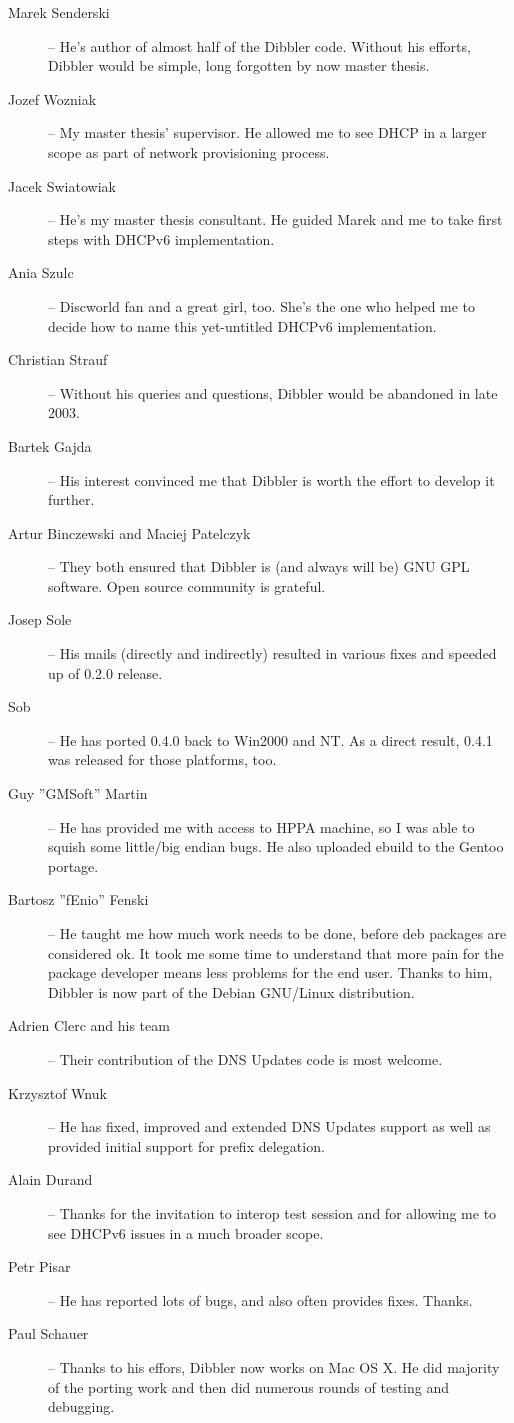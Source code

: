 \begin{description}
\item[Marek Senderski] -- He's author of almost half of the Dibbler
  code. Without his efforts, Dibbler would be simple, long forgotten
  by now master thesis.
\item[Jozef Wozniak] -- My master thesis' supervisor. He allowed me to
  see DHCP in a larger scope as part of network provisioning process.
\item[Jacek Swiatowiak] -- He's my master thesis consultant. He guided
  Marek and me to take first steps with DHCPv6 implementation.
\item[Ania Szulc] -- Discworld fan and a great girl, too. She's the one
  who helped me to decide how to name this yet-untitled DHCPv6 implementation.
\item[Christian Strauf] -- Without his queries and questions, Dibbler
  would be abandoned in late 2003.
\item[Bartek Gajda] -- His interest convinced me that Dibbler is worth
  the effort to develop it further.
\item[Artur Binczewski and Maciej Patelczyk] -- They both ensured that
  Dibbler is (and always will be) GNU GPL software. Open source
  community is grateful.
\item[Josep Sole] -- His mails (directly and indirectly) resulted in
  various fixes and speeded up of 0.2.0 release.
\item[Sob] -- He has ported 0.4.0 back to Win2000 and NT. As a direct
  result, 0.4.1 was released for those platforms, too.
\item[Guy ''GMSoft'' Martin] -- He has provided me with access to HPPA
  machine, so I was able to squish some little/big endian bugs. He
  also uploaded ebuild to the Gentoo portage.
\item[Bartosz ''fEnio'' Fenski] -- He taught me how much work needs to
  be done, before deb packages are considered ok. It took me some time
  to understand that more pain for the package developer means less
  problems for the end user.  Thanks to him, Dibbler is now part of
  the Debian GNU/Linux distribution.
\item[Adrien Clerc and his team] -- Their contribution of the DNS
  Updates code is most welcome.
\item[Krzysztof Wnuk] -- He has fixed, improved and extended DNS
  Updates support as well as provided initial support for prefix
  delegation.
\item[Alain Durand] -- Thanks for the invitation to interop test
  session and for allowing me to see DHCPv6 issues in a much broader
  scope.
\item[Petr Pisar] -- He has reported lots of bugs, and also often
  provides fixes.  Thanks.
\item[Paul Schauer] -- Thanks to his effors, Dibbler now works on Mac
  OS X. He did majority of the porting work and then did numerous
  rounds of testing and debugging.
\end{description}

